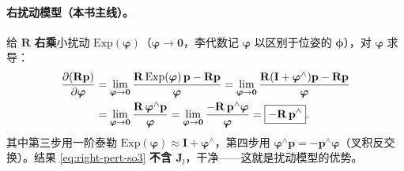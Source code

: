 \paragraph{右扰动模型（本书主线）。}给 $\mathbf{R}$ \textbf{右乘}小扰动 $\mathrm{Exp}(\boldsymbol{\varphi})$（$\boldsymbol{\varphi}\to\mathbf{0}$，李代数记 $\boldsymbol{\varphi}$ 以区别于位姿的 $\boldsymbol{\phi}$），对 $\boldsymbol{\varphi}$ 求导：
\begin{align}
  \frac{\partial(\mathbf{R}\mathbf{p})}{\partial\boldsymbol{\varphi}}
  &=\lim_{\boldsymbol{\varphi}\to\mathbf{0}}\frac{\mathbf{R}\,\mathrm{Exp}(\boldsymbol{\varphi})\,\mathbf{p}-\mathbf{R}\mathbf{p}}{\boldsymbol{\varphi}}
   =\lim_{\boldsymbol{\varphi}\to\mathbf{0}}\frac{\mathbf{R}(\mathbf{I}+\boldsymbol{\varphi}^\wedge)\mathbf{p}-\mathbf{R}\mathbf{p}}{\boldsymbol{\varphi}}\notag\\
  &=\lim_{\boldsymbol{\varphi}\to\mathbf{0}}\frac{\mathbf{R}\,\boldsymbol{\varphi}^\wedge\mathbf{p}}{\boldsymbol{\varphi}}
   =\lim_{\boldsymbol{\varphi}\to\mathbf{0}}\frac{-\mathbf{R}\,\mathbf{p}^\wedge\boldsymbol{\varphi}}{\boldsymbol{\varphi}}
   =\boxed{-\mathbf{R}\,\mathbf{p}^\wedge}.
  \label{eq:right-pert-so3}
\end{align}
其中第三步用一阶泰勒 $\mathrm{Exp}(\boldsymbol{\varphi})\approx\mathbf{I}+\boldsymbol{\varphi}^\wedge$，第四步用 $\boldsymbol{\varphi}^\wedge\mathbf{p}=-\mathbf{p}^\wedge\boldsymbol{\varphi}$（叉积反交换）。结果 \cref{eq:right-pert-so3} \textbf{不含 $\mathbf{J}_l$}，干净——这就是扰动模型的优势。

